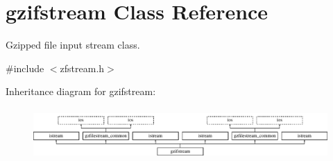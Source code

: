\hypertarget{classgzifstream}{}\section{gzifstream Class Reference}
\label{classgzifstream}


Gzipped file input stream class.  




{\ttfamily \#include $<$zfstream.\+h$>$}

Inheritance diagram for gzifstream\+:\begin{figure}[H]
\begin{center}
\leavevmode
\includegraphics[height=2.000000cm]{classgzifstream}
\end{center}
\end{figure}

